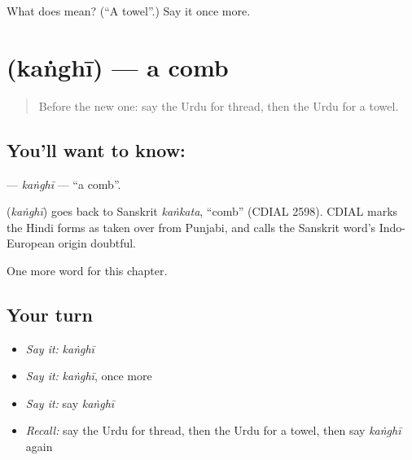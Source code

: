 \begin{tcolorbox}[breakable,colback=teal!4,colframe=teal!35!black,title={Before you move on}]
What does  mean? (\textquotedblleft{}A towel\textquotedblright{}.) Say it once more.
\end{tcolorbox}
\section[\texorpdfstring{\ur{کنگھی} (kaṅghī)}{کنگھی (kaṅghī)}]{ (kaṅghī) — a comb}

\label{lesson:UR-C106-kanghi}



\begin{quote}
Before the new one: say the Urdu for thread, then the Urdu for a towel.
\end{quote}

\subsection*{You'll want to know: }
\textbf{} — \emph{kaṅghī} — \textquotedblleft{}a comb\textquotedblright{}.

\begin{cousinweb}
\textbf{} (\emph{kaṅghī}) goes back to Sanskrit \emph{kaṅkata}, \textquotedblleft{}comb\textquotedblright{} (CDIAL 2598). CDIAL marks the Hindi forms as taken over from Punjabi, and calls the Sanskrit word's Indo-European origin doubtful.
\end{cousinweb}

\begin{grammarlens}[title={What you've built}]
One more word for this chapter.
\end{grammarlens}

\subsection*{Your turn}
\begin{itemize}
\raggedright
  \item \emph{Say it:} \emph{kaṅghī}
  \item \emph{Say it:} \emph{kaṅghī}, once more
  \item \emph{Say it:} say \emph{kaṅghī}
  \item \emph{Recall:} say the Urdu for thread, then the Urdu for a towel, then say \emph{kaṅghī} again
\end{itemize}

